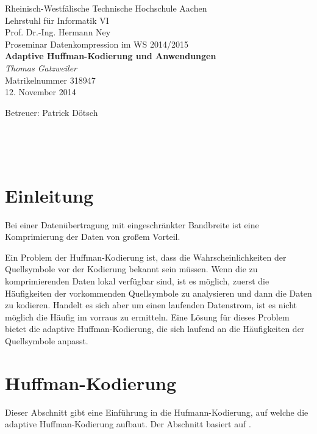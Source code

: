 \documentclass[twoside,11pt,a4paper]{article}
\theoremstyle{break}
\begin{document}
\pagestyle{empty}
\begin{center}
    Rheinisch-Westfälische Technische Hochschule Aachen \\
    Lehrstuhl für Informatik VI \\
    Prof. Dr.-Ing. Hermann Ney\\[6ex]
    Proseminar Datenkompression im WS 2014/2015\\[12ex]

    \LARGE
    \textbf{Adaptive Huffman-Kodierung und Anwendungen} \\[6ex]
    \textit{Thomas Gatzweiler} \\[6ex]
    \Large
    Matrikelnummer 318947 \\[6ex]
    12. November 2014

    \vfill
    \Large Betreuer: Patrick Dötsch
\end{center}

\newpage
\
\newpage

\pagestyle{headings}
\tableofcontents
\listoftables
\listoffigures
\newpage
\pagestyle{empty}
\
\newpage
\pagestyle{headings}


\setlength{\parindent}{0pt}
\setlength{\parskip}{2ex plus 0.5ex minus 0.2ex}

\nocite{*}

\section{Einleitung}

Bei einer Datenübertragung mit eingeschränkter Bandbreite ist eine
Komprimierung der Daten von großem Vorteil.

Ein Problem der Huffman-Kodierung ist, dass die Wahrscheinlichkeiten
der Quellsymbole vor der Kodierung bekannt sein müssen. Wenn die zu
komprimierenden Daten lokal verfügbar sind, ist es möglich, zuerst die
Häufigkeiten der vorkommenden Quellsymbole zu analysieren und dann die
Daten zu kodieren. Handelt es sich aber um einen laufenden Datenstrom,
ist es nicht möglich die Häufig im vorraus zu ermitteln. Eine Lösung
für dieses Problem bietet die adaptive Huffman-Kodierung, die sich
laufend an die Häufigkeiten der Quellsymbole anpasst.

\section{Huffman-Kodierung}

Dieser Abschnitt gibt eine Einführung in die Hufmann-Kodierung, auf
welche die adaptive Huffman-Kodierung aufbaut. Der Abschnitt basiert
auf \cite[S.  214-228]{Salomon:2010}.
\end{document}
